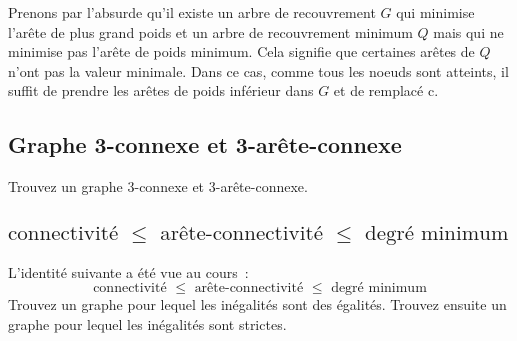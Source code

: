\begin{solution}
Prenons par l'absurde qu'il existe un arbre de recouvrement $G$ qui minimise l'arête de plus grand poids et un arbre de recouvrement minimum $Q$ mais qui ne minimise pas l'arête de poids minimum. Cela signifie que certaines arêtes de $Q$ n'ont pas la valeur minimale. Dans ce cas, comme tous les noeuds sont atteints, il suffit de prendre les arêtes de poids inférieur dans $G$ et de remplacé c.
\end{solution}

\subsection{Graphe 3-connexe et 3-arête-connexe}
Trouvez un graphe 3-connexe et 3-arête-connexe.

\begin{solution}
\end{solution}

\subsection{$ \text{connectivité } \leq \text{ arête-connectivité } \leq \text{ degré minimum} $}
L'identité suivante a été vue au cours~:
\[
  \text{connectivité } \leq \text{ arête-connectivité } \leq \text{ degré minimum}
\]
Trouvez un graphe pour lequel les inégalités sont des égalités. Trouvez ensuite un graphe pour lequel les inégalités sont strictes.


